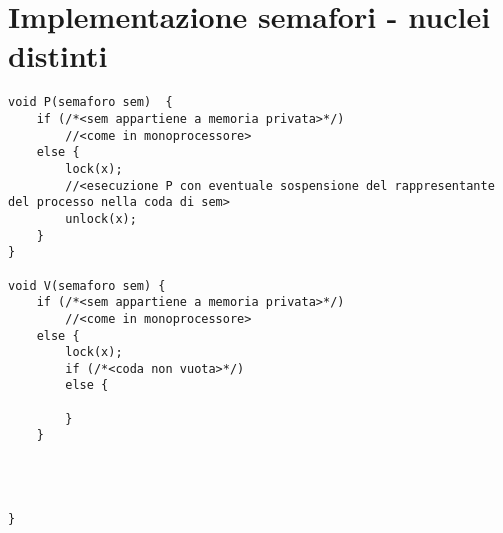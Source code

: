 \section{Implementazione semafori - nuclei distinti}
\begin{verbatim}
void P(semaforo sem)  {
    if (/*<sem appartiene a memoria privata>*/)
        //<come in monoprocessore>
    else {
        lock(x);
        //<esecuzione P con eventuale sospensione del rappresentante del processo nella coda di sem>
        unlock(x);
    }
}

void V(semaforo sem) {
    if (/*<sem appartiene a memoria privata>*/)
        //<come in monoprocessore>
    else {
        lock(x);
        if (/*<coda non vuota>*/)
        else {
        
        }
    }




}
\end{verbatim}










































































































